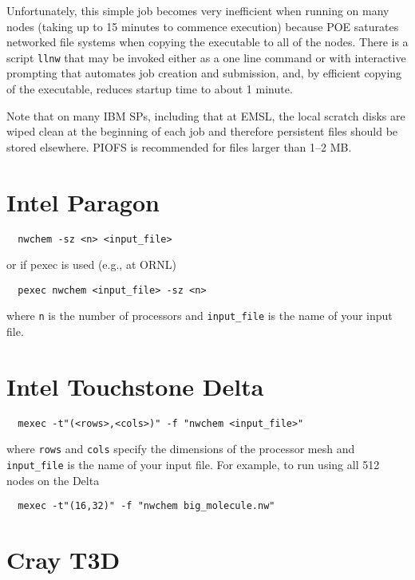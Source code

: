 Unfortunately, this simple job becomes very inefficient when running
on many nodes (taking up to 15 minutes to commence execution) because
POE saturates networked file systems when copying the executable to
all of the nodes.  There is a script \verb+llnw+ that may be invoked
either as a one line command or with interactive prompting that
automates job creation and submission, and, by efficient copying of the
executable, reduces startup time to about 1 minute.

Note that on many IBM SPs, including that at EMSL, the local scratch
disks are wiped clean at the beginning of each job and therefore
persistent files should be stored elsewhere.  PIOFS is recommended for
files larger than 1--2 MB.

\section{Intel Paragon}

\begin{verbatim}
  nwchem -sz <n> <input_file>
\end{verbatim}

or if pexec is used (e.g., at ORNL)

\begin{verbatim}
  pexec nwchem <input_file> -sz <n>
\end{verbatim}

where \verb+n+ is the number of processors and \verb+input_file+ is the
name of your input file.


\section{Intel Touchstone Delta}

\begin{verbatim}
  mexec -t"(<rows>,<cols>)" -f "nwchem <input_file>"
\end{verbatim}

where \verb+rows+ and \verb+cols+ specify the dimensions of the
processor mesh and \verb+input_file+ is the name of your input file.
For example, to run using all 512 nodes on the Delta
\begin{verbatim}
  mexec -t"(16,32)" -f "nwchem big_molecule.nw"
\end{verbatim}

\section{Cray T3D}

